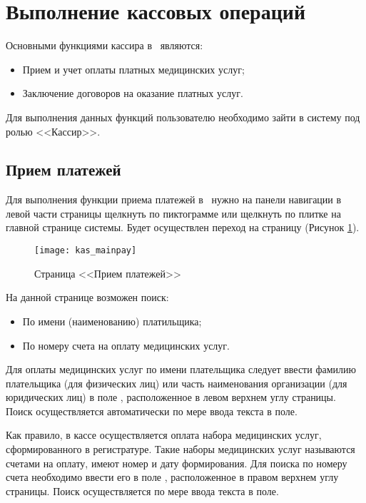 \newpage
\section{Выполнение кассовых операций}

Основными функциями кассира в \tmisp~являются:

\begin{itemize}
 \item Прием и учет оплаты платных медицинских услуг;
 \item Заключение договоров на оказание платных услуг.
\end{itemize}

Для выполнения данных функций пользователю необходимо зайти в систему под ролью <<Кассир>>.


\subsection{Прием платежей}

Для выполнения функции приема платежей в \tmisp~нужно на панели навигации в левой части страницы щелкнуть по пиктограмме  или щелкнуть по плитке  на главной странице системы. Будет осуществлен переход на страницу  (Рисунок \ref{img_kas_mainpay}). 

\begin{figure}[ht]\centering
	\texttt{[image: kas\_mainpay]}
	\caption{Страница <<Прием платежей>>}
	\label{img_kas_mainpay}
\end{figure}

На данной странице возможен поиск:
\begin{itemize}
 \item По имени (наименованию) платильщика;
 \item По номеру счета на оплату медицинских услуг.
\end{itemize}

Для оплаты медицинских услуг по имени плательщика следует ввести фамилию плательщика (для физических лиц) или часть наименования организации (для юридических лиц) в поле , расположенное в левом верхнем углу страницы. Поиск осуществляется автоматически по мере ввода текста в поле.

Как правило, в кассе осуществляется оплата набора медицинских услуг, сформированного в регистратуре. Такие наборы медицинских услуг называются счетами на оплату, имеют номер и дату формирования. Для поиска по номеру счета необходимо ввести его в поле , расположенное в правом верхнем углу страницы.  Поиск осуществляется по мере ввода текста в поле.


